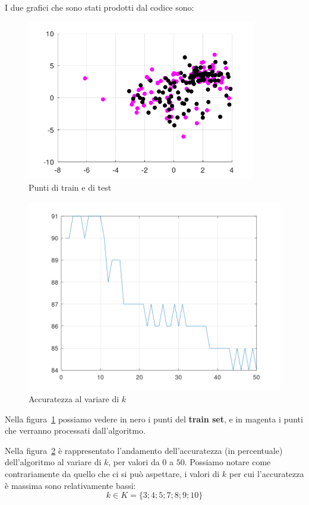 \documentclass[a4paper]{article}
\begin{document}
I due grafici che sono stati prodotti dal codice sono:
\begin{figure}
\centering
\label{fig:punti}
\includegraphics[width=10cm]{punti}
\caption{Punti di train e di test}
\end{figure}
\begin{figure}
\centering
\label{fig:acc}
\includegraphics[width=12cm]{accuratezza}
\caption{Accuratezza al variare di $k$}
\end{figure}

Nella figura~\ref{fig:punti} possiamo vedere in nero i punti del \textbf{train set}, e in magenta i punti che verranno processati dall'algoritmo.

Nella figura~\ref{fig:acc} è rappresentato l'andamento dell'accuratezza (in percentuale) dell'algoritmo al variare di $k$, per valori da $0$ a $50$. Possiamo notare come contrariamente da quello che ci si può aspettare, i valori di $k$ per cui l'accuratezza è massima sono relativamente bassi:
\[
k \in K = \{3; 4; 5; 7; 8; 9; 10\}
\]
\end{document}
